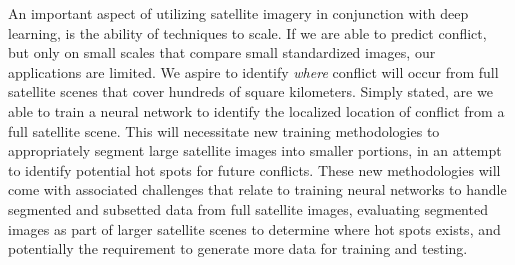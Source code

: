 An important aspect of utilizing satellite imagery in conjunction with deep learning, is the ability of techniques to scale.  If we are able to predict conflict, but only on small scales that compare small standardized images, our applications are limited.  We aspire to identify \textit{where} conflict will occur from full satellite scenes that cover hundreds of square kilometers.  Simply stated, are we able to train a neural network to identify the localized location of conflict from a full satellite scene.  This will necessitate new training methodologies to appropriately segment large satellite images into smaller portions, in an attempt to identify potential hot spots for future conflicts. These new methodologies will come with associated challenges that relate to training neural networks to handle segmented and subsetted data from full satellite images,  evaluating segmented images as part of larger satellite scenes to determine where hot spots exists, and potentially the requirement to generate more data for training and testing.



